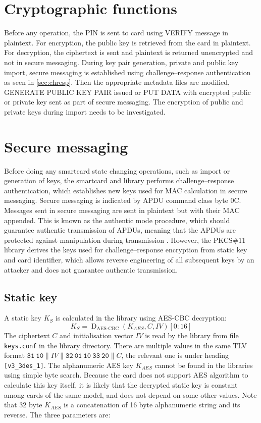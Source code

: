 \documentclass[a4paper]{article}
\newcommand{\conc}{\mathbin{\|}}
\DeclareMathOperator{\D}{D}
\begin{document}
\section{Cryptographic functions}

Before any operation, the PIN is sent to card using VERIFY message in plaintext.
For encryption, the public key is retrieved from the card in plaintext. For decryption, the ciphertext is sent and plaintext is returned unencrypted and not in secure messaging. During key pair generation, private and public key import, secure messaging is established using challenge--response authentication as seen in \autoref{sec:chresp}. Then the appropriate metadata files are modified, GENERATE PUBLIC KEY PAIR issued or PUT DATA with encrypted public or private key sent as part of secure messaging. The encryption of public and private keys during import needs to be investigated.


\section{Secure messaging}

Before doing any smartcard state changing operations, such as import or generation of keys, the smartcard and library performs challenge--response authentication, which establishes new keys used for MAC calculation in secure messaging. Secure messaging is indicated by APDU command class byte 0C. Messages sent in secure messaging are sent in plaintext but with their MAC appended. This is known as the authentic mode procedure, which should guarantee authentic transmission of APDUs, meaning that the APDUs are protected against manipulation during transmission \cite{rankl2004smart}. However, the PKCS\#11 library derives the keys used for challenge--response encryption from static key and card identifier, which allows reverse engineering of all subsequent keys by an attacker and does not guarantee authentic transmission.

\subsection{Static key}

A static key $K_S$ is calculated in the library using AES-CBC decryption:
\[
K_S=\D_\textrm{AES-CBC}(K_{AES}, C, IV)[0:16]
\]
The ciphertext $C$ and initialisation vector $IV$ is read by the library from file \texttt{keys.conf} in the library directory. There are multiple values in the same TLV format $\mathtt{31~10}\conc IV\conc\mathtt{32~01~10~33~20}\conc C$, the relevant one is under heading \texttt{[v3\_3des\_1]}. The alphanumeric AES key $K_{AES}$ cannot be found in the libraries using simple byte search. Because the card does not support AES algorithm to calculate this key itself, it is likely that the decrypted static key is constant among cards of the same model, and does not depend on some other values. Note that 32 byte $K_{AES}$ is a concatenation of 16 byte alphanumeric string and its reverse. The three parameters are:
\end{document}
